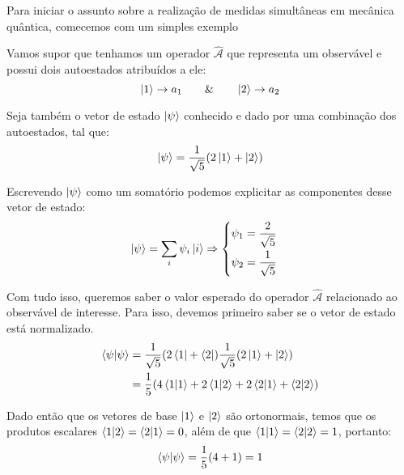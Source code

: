     Para iniciar o assunto sobre a realização de medidas simultâneas em mecânica quântica, comecemos com um simples exemplo
    
    \begin{example}
        Vamos supor que tenhamos um operador $\hat{\mathcal{A}}$ que representa um observável e possui dois autoestados atribuídos a ele:
            \begin{equation*}
                \ket{1}\rightarrow a_{1} \qquad \& \qquad 
                \ket{2}\rightarrow a_{2} 
            \end{equation*}
        
        Seja também o vetor de estado $\ket{\psi}$ conhecido e dado por uma combinação dos autoestados, tal que:
            \begin{equation*}
                \ket{\psi} = \dfrac{1}{\sqrt{5}}(2\ket{1} + \ket{2})
            \end{equation*}
        
        Escrevendo $\ket{\psi}$ como um somatório podemos explicitar as componentes desse vetor de estado:
            \begin{equation*}
                \ket{\psi} = \sum_{i}\psi_{i}\ket{i} \Rightarrow 
                \begin{cases}
                \begin{aligned}
                    \psi_{1} &= \dfrac{2}{\sqrt{5}} \\
                    \psi_{2} &= \dfrac{1}{\sqrt{5}}
                \end{aligned}
                \end{cases}
            \end{equation*}
        
        Com tudo isso, queremos saber o valor esperado do operador $\hat{\mathcal{A}}$ relacionado ao observável de interesse. Para isso, devemos primeiro saber se o vetor de estado está normalizado.
            \begin{align*}
                \braket{\psi}{\psi} &= 
                \dfrac{1}{\sqrt{5}}(2\bra{1} + \bra{2})\dfrac{1}{\sqrt{5}}(2\ket{1}+\ket{2}) \\
                &= \dfrac{1}{5}(4\braket{1}{1} + 2\braket{1}{2} + 2\braket{2}{1} + \braket{2}{2})
            \end{align*}
        
        Dado então que os vetores de base $\ket{1}$ e $\ket{2}$ são ortonormais, temos que os produtos escalares $\braket{1}{2} = \braket{2}{1} = 0$, além de que $\braket{1}{1} = \braket{2}{2} = 1$, portanto:
            \begin{equation*}
                \braket{\psi}{\psi} = \dfrac{1}{5}(4+1) = 1
            \end{equation*}
        

\end{example}

